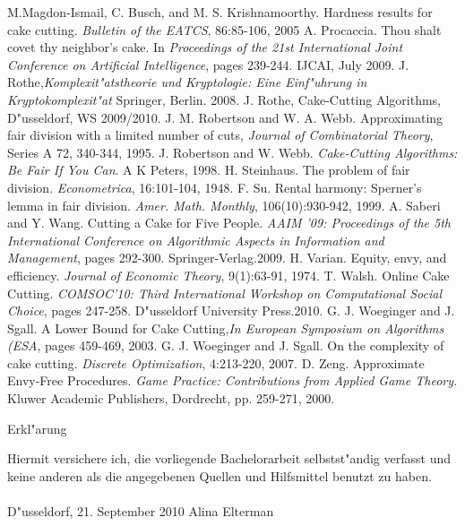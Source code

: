 \documentclass[11pt, a4paper, twoside]{article}
\newcommand{\tf}{\color{black}}
\numberwithin{equation}{section}
\begin{document}
\begin{thebibliography}{9}
 M.Magdon-Ismail, C. Busch, and
M. S. Krishnamoorthy. Hardness results for cake cutting. \emph{Bulletin of the EATCS}, 86:85-106, 2005
 A. Procaccia. Thou shalt covet thy neighbor's cake. In \emph{Proceedings of the 21st International Joint Conference on Artificial Intelligence}, pages 239-244. IJCAI, July 2009.
 J. Rothe,\emph{Komplexit"atstheorie und Kryptologie: Eine Einf"uhrung in Kryptokomplexit"at} Springer, Berlin. 2008.
 J. Rothe, Cake-Cutting Algorithms, D"usseldorf, WS 2009/2010.
 J. M. Robertson and W. A. Webb. Approximating fair division with a limited number of cuts, \emph{Journal of Combinatorial Theory}, Series A 72, 340-344, 1995.
 J. Robertson and W. Webb. \emph{Cake-Cutting Algorithms: Be Fair If You Can}. A K Peters, 1998.
 H. Steinhaus. The problem of fair division. \emph{Econometrica}, 16:101-104, 1948.
 F. Su. Rental harmony: Sperner's lemma in fair division. \emph{Amer. Math. Monthly}, 106(10):930-942, 1999.
 A. Saberi and Y. Wang. Cutting a Cake for Five People. \emph{AAIM '09: Proceedings of the 5th International Conference on Algorithmic Aspects in Information and Management}, pages 292-300. Springer-Verlag.2009.
 H. Varian. Equity, envy, and efficiency. \emph{Journal of Economic Theory}, 9(1):63-91, 1974.
 T. Walsh. Online Cake Cutting. \emph{COMSOC'10: Third International Workshop on Computational Social Choice}, pages 247-258. D"usseldorf University Press.2010.
 G. J. Woeginger and J. Sgall. A Lower Bound for Cake Cutting,\emph{In European Symposium on Algorithms (ESA}, pages 459-469, 2003.
 G. J. Woeginger and J. Sgall.
On the complexity of cake cutting. \emph{Discrete Optimization},
4:213-220, 2007.
 D. Zeng. Approximate Envy-Free Procedures. \emph{Game Practice: Contributions from Applied Game Theory.} Kluwer Academic Publishers, Dordrecht, pp. 259-271, 2000.
\end{thebibliography}
\newpage
\thispagestyle{empty}
\tf
\begin{center}
\Huge Erkl"arung
\end{center}
\vspace{1cm}
\noindent Hiermit versichere ich, die vorliegende Bachelorarbeit selbstst"andig verfasst und keine anderen als die angegebenen Quellen und Hilfsmittel benutzt zu haben.\\
\vspace{3cm}\\
D"usseldorf, 21. September 2010 \hfill Alina Elterman
\end{document}

